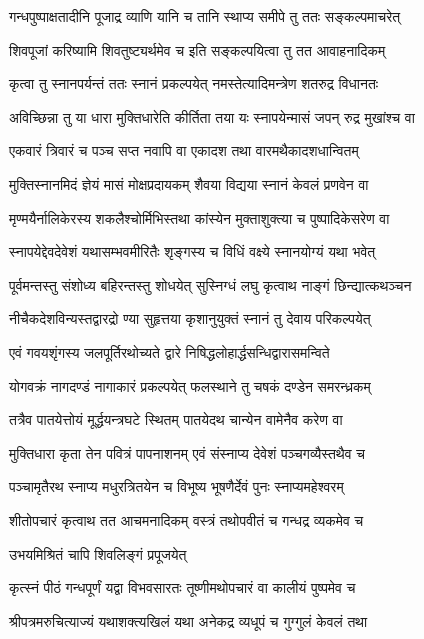 \twolineshloka
{गन्धपुष्पाक्षतादीनि पूजाद्र व्याणि यानि च}
{तानि स्थाप्य समीपे तु ततः सङ्कल्पमाचरेत्}%

\twolineshloka
{शिवपूजां करिष्यामि शिवतुष्ट्यर्थमेव च}
{इति सङ्कल्पयित्वा तु तत आवाहनादिकम्}%

\twolineshloka
{कृत्वा तु स्नानपर्यन्तं ततः स्नानं प्रकल्पयेत्}
{नमस्तेत्यादिमन्त्रेण शतरुद्र विधानतः}%

\twolineshloka
{अविच्छिन्ना तु या धारा मुक्तिधारेति कीर्तिता}
{तया यः स्नापयेन्मासं जपन् रुद्र मुखांश्च वा}%

\twolineshloka
{एकवारं त्रिवारं च पञ्च सप्त नवापि वा}
{एकादश तथा वारमथैकादशधान्वितम्}%

\twolineshloka
{मुक्तिस्नानमिदं ज्ञेयं मासं मोक्षप्रदायकम्}
{शैवया विद्यया स्नानं केवलं प्रणवेन वा}%

\twolineshloka
{मृण्मयैर्नालिकेरस्य शकलैश्चोर्मिभिस्तथा}
{कांस्येन मुक्ताशुक्त्या च पुष्पादिकेसरेण वा}%

\twolineshloka
{स्नापयेद्देवदेवेशं यथासम्भवमीरितैः}
{शृङ्गस्य च विधिं वक्ष्ये स्नानयोग्यं यथा भवेत्}%

\twolineshloka
{पूर्वमन्तस्तु संशोध्य बहिरन्तस्तु शोधयेत्}
{सुस्निग्धं लघु कृत्वाथ नाङ्गं छिन्द्यात्कथञ्चन}%

\twolineshloka
{नीचैकदेशविन्यस्तद्वारद्रो ण्या सुहृत्तया}
{कृशानुयुक्तं स्नानं तु देवाय परिकल्पयेत्}%

\twolineshloka
{एवं गवयशृंगस्य जलपूर्तिरथोच्यते}
{द्वारे निषिद्धलोहार्द्धसन्धिद्वारासमन्विते}%

\twolineshloka
{योगवक्रं नागदण्डं नागाकारं प्रकल्पयेत्}
{फलस्थाने तु चषकं दण्डेन समरन्ध्रकम्}%

\twolineshloka
{तत्रैव पातयेत्तोयं मूर्द्धयन्त्रघटे स्थितम्}
{पातयेदथ चान्येन वामेनैव करेण वा}%

\twolineshloka
{मुक्तिधारा कृता तेन पवित्रं पापनाशनम्}
{एवं संस्नाप्य देवेशं पञ्चगव्यैस्तथैव च}%

\twolineshloka
{पञ्चामृतैरथ स्नाप्य मधुरत्रितयेन च}
{विभूष्य भूषणैर्देवं पुनः स्नाप्यमहेश्वरम्}%

\twolineshloka
{शीतोपचारं कृत्वाथ तत आचमनादिकम्}
{वस्त्रं तथोपवीतं च गन्धद्र व्यकमेव च}%


{उभयमिश्रितं चापि शिवलिङ्गं प्रपूजयेत्}

\twolineshloka
{कृत्स्नं पीठं गन्धपूर्णं यद्वा विभवसारतः}
{तूष्णीमथोपचारं वा कालीयं पुष्पमेव च}%

\twolineshloka
{श्रीपत्रमरुचित्याज्यं यथाशक्त्यखिलं यथा}
{अनेकद्र व्यधूपं च गुग्गुलं केवलं तथा}%

